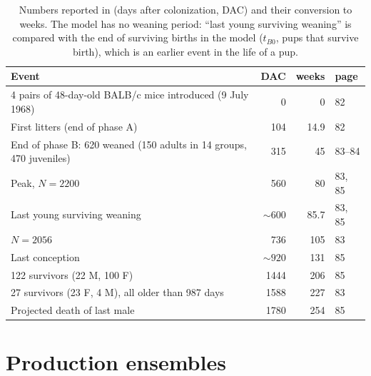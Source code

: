 \documentclass[pre,onecolumn,superscriptaddress,notitlepage]{revtex4-2}
\begin{document}
\begin{table}[ht]
\centering\small
\caption{Numbers reported in \cite{Calhoun1973} (days after colonization, DAC) and their conversion to weeks.
The model has no weaning period: ``last young surviving weaning'' is compared with the end of surviving births in
the model ($t_{B0}$, pups that survive birth), which is an earlier event in the life of a pup.}
\label{tab:calhoun-numbers}
\begin{tabular}{@{}lrrl@{}}
\toprule
Event & DAC & weeks & page \\
\midrule
4 pairs of 48-day-old BALB/c mice introduced (9 July 1968) & 0 & 0 & 82 \\
First litters (end of phase A) & 104 & 14.9 & 82 \\
End of phase B: 620 weaned (150 adults in 14 groups, 470 juveniles) & 315 & 45 & 83--84 \\
Peak, $N=2200$ & 560 & 80 & 83, 85 \\
Last young surviving weaning & ${\sim}600$ & 85.7 & 83, 85 \\
$N=2056$ & 736 & 105 & 83 \\
Last conception & ${\sim}920$ & 131 & 85 \\
122 survivors (22 M, 100 F) & 1444 & 206 & 85 \\
27 survivors (23 F, 4 M), all older than 987 days & 1588 & 227 & 83 \\
Projected death of last male & 1780 & 254 & 85 \\
\bottomrule
\end{tabular}
\end{table}

\section{Production ensembles}
\label{supp:production}
\end{document}
